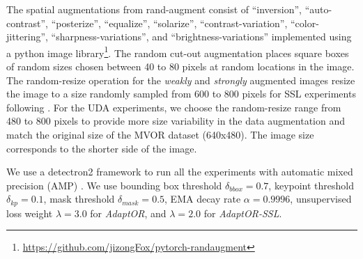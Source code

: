 The spatial augmentations from rand-augment \citep{cubuk2020randaugment} consist of ``inversion'', ``auto-contrast'', ``posterize'', ``equalize'', ``solarize'', ``contrast-variation'', ``color-jittering'', ``sharpness-variations'', and  ``brightness-variations'' {\blue implemented using a python image library\footnote{\url{https://github.com/jizongFox/pytorch-randaugment}}}. 
The random cut-out \citep{devries2017improved} augmentation places square boxes of random sizes chosen between 40 to 80 pixels at random locations in the image. The random-resize operation for the \emph{weakly} and \emph{strongly} augmented images resize the image to a size randomly sampled from 600 to 800 pixels for SSL experiments following \citep{he2017mask}. For the UDA experiments, we choose the random-resize range from 480 to 800 pixels to provide more size variability in the data augmentation and match the original size of the MVOR dataset (640x480). The image size corresponds to the shorter side of the image.

We use a detectron2 framework \citep{wu2019detectron2} to run all the experiments with automatic mixed precision (AMP) \citep{micikevicius2017mixed}. We use bounding box threshold $\delta_{bbox} = 0.7$, keypoint threshold $\delta_{kp} = 0.1$, mask threshold $\delta_{mask} = 0.5$, EMA decay rate $\alpha = 0.9996$, unsupervised loss weight $\lambda = 3.0$ for \emph{AdaptOR}, and $\lambda = 2.0$ for \emph{AdaptOR-SSL}.

